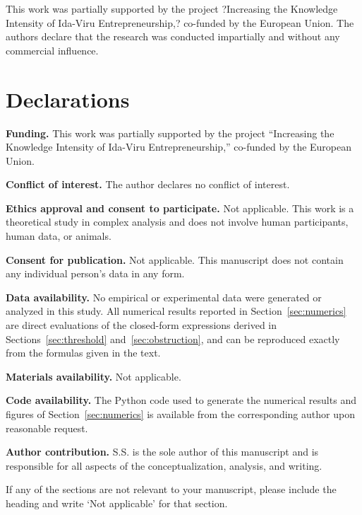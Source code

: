 \documentclass[pdflatex,sn-mathphys-num]{sn-jnl}%
\theoremstyle{thmstyleone}%
\theoremstyle{thmstyletwo}%
\theoremstyle{thmstylethree}%
\begin{document}

This work was partially supported by the project ?Increasing the Knowledge Intensity of Ida-Viru Entrepreneurship,? co-funded by the European Union. The authors declare that the research was conducted impartially and without any commercial influence.

\section*{Declarations}

\textbf{Funding.} This work was partially supported by the project ``Increasing the Knowledge Intensity of Ida-Viru Entrepreneurship,'' co-funded by the European Union.

\textbf{Conflict of interest.} The author declares no conflict of interest.

\textbf{Ethics approval and consent to participate.} Not applicable. This work is a theoretical study in complex analysis and does not involve human participants, human data, or animals.

\textbf{Consent for publication.} Not applicable. This manuscript does not contain any individual person's data in any form.

\textbf{Data availability.} No empirical or experimental data were generated or analyzed in this study. All numerical results reported in Section~\ref{sec:numerics} are direct evaluations of the closed-form expressions derived in Sections~\ref{sec:threshold} and~\ref{sec:obstruction}, and can be reproduced exactly from the formulas given in the text.

\textbf{Materials availability.} Not applicable.

\textbf{Code availability.} The Python code used to generate the numerical results and figures of Section~\ref{sec:numerics} is available from the corresponding author upon reasonable request.

\textbf{Author contribution.} S.S. is the sole author of this manuscript and is responsible for all aspects of the conceptualization, analysis, and writing.

\noindent
If any of the sections are not relevant to your manuscript, please include the heading and write `Not applicable' for that section. 

%
%
%
%
\end{document}
